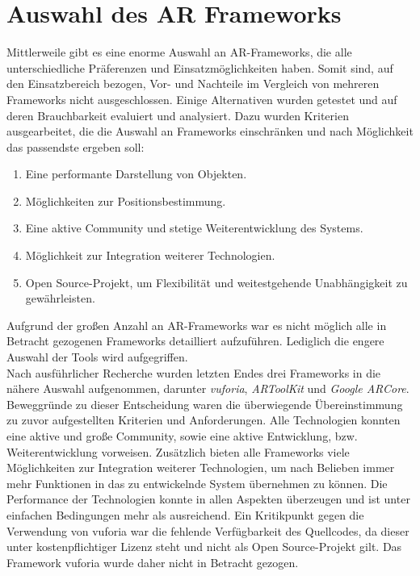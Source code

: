 \section{Auswahl des AR Frameworks}
\label{chap:Auswahl des AR Frameworks}
Mittlerweile gibt es eine enorme Auswahl an \acs{AR}-Frameworks, die alle unterschiedliche Präferenzen und 
Einsatzmöglichkeiten haben. Somit sind, auf den Einsatzbereich bezogen, Vor- und Nachteile im Vergleich von mehreren Frameworks nicht ausgeschlossen. 
Einige Alternativen wurden getestet und auf deren Brauchbarkeit evaluiert und analysiert. Dazu wurden Kriterien ausgearbeitet, die die 
Auswahl an Frameworks einschränken und nach Möglichkeit das passendste ergeben soll: 
\begin{enumerate}
    \item Eine performante Darstellung von Objekten.
    \item Möglichkeiten zur Positionsbestimmung.
    \item Eine aktive Community und stetige Weiterentwicklung des Systems.
    \item Möglichkeit zur Integration weiterer Technologien.
    \item Open Source-Projekt, um Flexibilität und weitestgehende Unabhängigkeit zu gewährleisten.
\end{enumerate}
Aufgrund der großen Anzahl an \acs{AR}-Frameworks war es nicht möglich alle in Betracht gezogenen Frameworks detailliert aufzuführen. 
Lediglich die engere Auswahl der Tools wird aufgegriffen. 
\\ 
Nach ausführlicher Recherche wurden letzten Endes drei Frameworks in die nähere Auswahl aufgenommen, darunter \textit{vuforia}, 
\textit{ARToolKit} und \textit{Google ARCore}. Beweggründe zu dieser Entscheidung waren die überwiegende 
Übereinstimmung zu zuvor aufgestellten Kriterien und Anforderungen. Alle Technologien konnten eine aktive und große Community, sowie eine 
aktive Entwicklung, bzw. Weiterentwicklung vorweisen. Zusätzlich bieten alle Frameworks viele Möglichkeiten zur Integration weiterer 
Technologien, um nach Belieben immer mehr Funktionen in das zu entwickelnde System übernehmen zu können. Die Performance der Technologien konnte 
in allen Aspekten überzeugen und ist unter einfachen Bedingungen mehr als ausreichend. Ein Kritikpunkt gegen die Verwendung von vuforia war 
die fehlende Verfügbarkeit des Quellcodes, da dieser unter kostenpflichtiger Lizenz steht und nicht als Open Source-Projekt gilt. Das Framework 
vuforia wurde daher nicht in Betracht gezogen.
